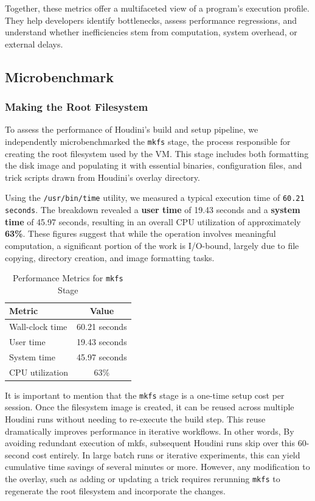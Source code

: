 \documentclass[12pt]{report}
\begin{document}
\begin{doublespace}
Together, these metrics offer a multifaceted view of a program’s execution profile. They help developers identify bottlenecks, assess performance regressions, and understand whether inefficiencies stem from computation, system overhead, or external delays.


\subsection{Microbenchmark}

\subsubsection{Making the Root Filesystem}

To assess the performance of Houdini’s build and setup pipeline, we independently microbenchmarked the \texttt{mkfs} stage, the process responsible for creating the root filesystem used by the VM. This stage includes both formatting the disk image and populating it with essential binaries, configuration files, and trick scripts drawn from Houdini’s overlay directory.

Using the \texttt{/usr/bin/time} utility, we measured a typical execution time of \texttt{60.21 seconds}. The breakdown revealed a \textbf{user time} of 19.43 seconds and a \textbf{system time} of 45.97 seconds, resulting in an overall CPU utilization of approximately \textbf{63\%}. These figures suggest that while the operation involves meaningful computation, a significant portion of the work is I/O-bound, largely due to file copying, directory creation, and image formatting tasks.

\begin{table}[h]
\centering
\caption{Performance Metrics for \texttt{mkfs} Stage}
\label{tab:mkfs-performance}
\begin{tabular}{|l|c|}
\hline
\textbf{Metric}         & \textbf{Value} \\
\hline
Wall-clock time         & 60.21 seconds \\
User time               & 19.43 seconds \\
System time             & 45.97 seconds \\
CPU utilization         & 63\% \\
\hline
\end{tabular}
\end{table}


It is important to mention that the \texttt{mkfs} stage is a one-time setup cost per session. Once the filesystem image is created, it can be reused across multiple Houdini runs without needing to re-execute the build step. This reuse dramatically improves performance in iterative workflows. In other words, By avoiding redundant execution of mkfs, subsequent Houdini runs skip over this 60-second cost entirely. In large batch runs or iterative experiments, this can yield cumulative time savings of several minutes or more. However, any modification to the overlay, such as adding or updating a trick requires rerunning \texttt{mkfs} to regenerate the root filesystem and incorporate the changes.



\end{doublespace}
\end{document}
